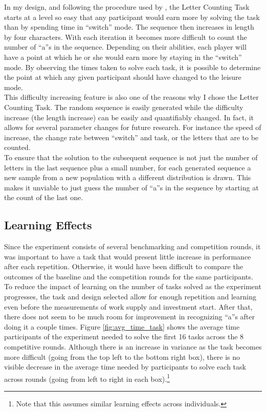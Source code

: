     In my design, and following the procedure used by \citeauthor{sausgruberForthcoming}, the Letter Counting Task starts at a level so easy that any participant would earn more by solving the task than by spending time in ``switch'' mode. The sequence then increases in length by four characters. With each iteration it becomes more difficult to count the number of ``a''s in the sequence. Depending on their abilities, each player will have a point at which he or she would earn more by staying in the ``switch'' mode. By observing the times taken to solve each task, it is possible to determine the point at which any given participant should have changed to the leisure mode.\\
    
    This difficulty increasing feature is also one of the reasons why I chose the Letter Counting Task. The random sequence is easily generated while the difficulty increase (the length increase) can be easily and quantifiably changed. In fact, it allows for several parameter changes for future research. For instance the speed of increase, the change rate between ``switch'' and task, or the letters that are to be counted.\\
    
    To ensure that the solution to the subsequent sequence is not just the number of letters in the last sequence plus a small number, for each generated sequence a new sample from a new population with a different distribution is drawn. This makes it unviable to just guess the number of ``a''s in the sequence by starting at the count of the last one.
    
        
    \subsection{Learning Effects}
    Since the experiment consists of several benchmarking and competition rounds, it was important to have a task that would present little increase in performance after each repetition. Otherwise, it would have been difficult to compare the outcomes of the baseline and the competition rounds for the same participants.\\
    
    To reduce the impact of learning on the number of tasks solved as the experiment progresses, the task and design selected allow for enough repetition and learning even before the measurements of work supply and investment start. 
    After that, there does not seem to be much room for improvement in recognizing ``a''s after doing it a couple times. Figure \ref{fig:avg_time_task} shows the average time participants of the experiment needed to solve the first 16 tasks across the 8 competitive rounds. Although there is an increase in variance as the task becomes more difficult (going from the top left to the bottom right box), there is no visible decrease in the average time needed by participants to solve each task across rounds (going from left to right in each box).\footnote{Note that this assumes similar learning effects across individuals.} 
    
